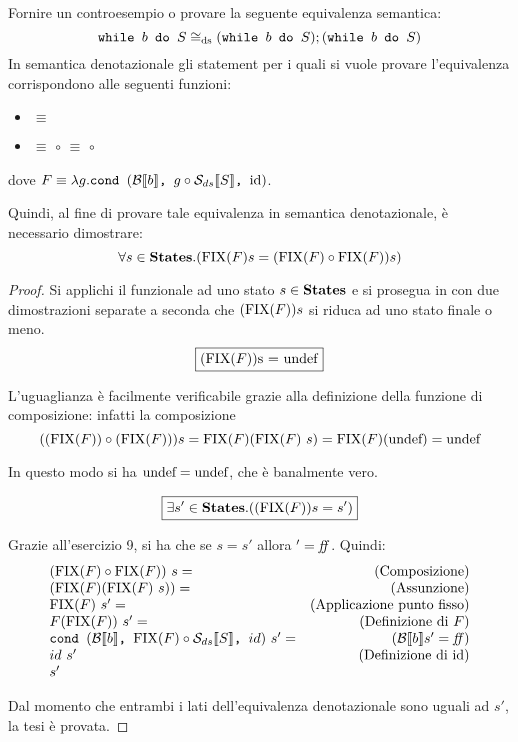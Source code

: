 {
  Fornire un controesempio o provare la seguente equivalenza semantica:
  $$
  \wbS{b}{S} \eqDS (\wbS{b}{S});(\wbS{b}{S})
  $$
}
{}
In semantica denotazionale gli statement per i quali si vuole provare
l'equivalenza corrispondono alle seguenti funzioni:
\begin{itemize}
  \item {}
        $\equiv$
  \item {}
        $\equiv$
         $\circ$ 
        $\equiv$
         $\circ$ 
\end{itemize}
dove $F \equiv{} \lambda{g}.\cond{b}{g \circ \dsCtxt{S}}{\idDS}$.

Quindi, al fine di provare tale equivalenza in semantica denotazionale, è
necessario dimostrare:
\begin{equation}
\forall s \in \states.(\fixp{F}s = (\fixp{F} \circ \fixp{F})s)
\label{hw10-thesis}
\end{equation}

\begin{proof}

Si applichi il funzionale  ad uno stato $s\in\states$ e si prosegua in
con due dimostrazioni separate a seconda che $(\fixp{F}) s$ si riduca ad uno
stato finale o meno.
$$
\boxed{(\fixp{F}) $s = \undefDS$}
$$

L'uguaglianza è facilmente verificabile grazie alla definizione della funzione
di composizione: infatti la composizione 
$$
((\fixp{F}) \circ (\fixp{F})) s = \fixp{F}(\fixp{F}\text{ }s) = \fixp{F}(\undefDS) = \undefDS
$$


In questo modo si ha $\undefDS = \undefDS$, che è banalmente vero.

$$
\boxed{\exists s' \in \states.((\fixp{F}) s = s')}
$$

Grazie all'esercizio 9, si ha che se  $s = s'$ allora
$' = \semfalse$. Quindi:
$$
\begin{array}{lr}
(\fixp{F} \circ \fixp{F})\ s = & \text{(Composizione)} \\
(\fixp{F} (\fixp{F}\ s)) = & \text{(Assunzione)} \\
\fixp{F}\  s' = & \text{(Applicazione punto fisso)}\\
F(\fixp{F})\ s' = & \text{(Definizione di $F$)} \\
\cond{b}{\fixp{F} \circ \dsCtxt{S}}{id}\ s' = & (\B{b}' = \semfalse) \\
id\ s' & \text{(Definizione di \idDS)} \\
s'
\end{array}
$$



Dal momento che entrambi i lati dell'equivalenza denotazionale sono uguali ad
$s'$, la tesi è provata.

\end{proof}
